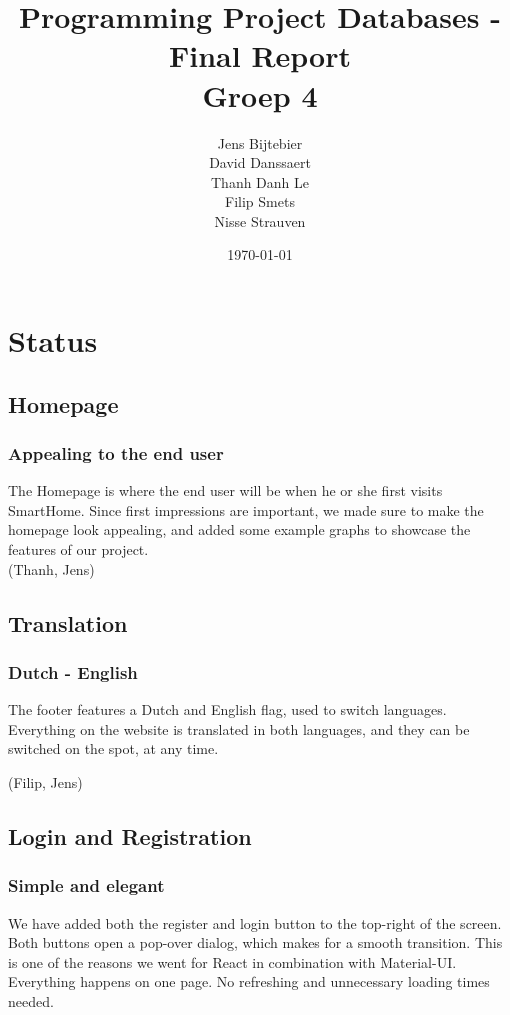 \documentclass[11pt]{article}
\title{\textbf{Programming Project Databases - Final Report}\\
		Groep 4}
\author{Jens Bijtebier\\
		David Danssaert\\
		Thanh Danh Le\\
		Filip Smets\\
		Nisse Strauven}
\date{\today}
\begin{document}
\maketitle


\section{Status}
  \subsection{Homepage}
	\subsubsection{Appealing to the end user}
		The Homepage is where the end user will be when he or she first visits SmartHome.
		Since first impressions are important, we made sure to make the homepage look appealing,
		and added some example graphs to showcase the features of our project.\\

		(Thanh, Jens)

  \subsection{Translation}
	\subsubsection{Dutch - English}
		The footer features a Dutch and English flag, used to switch languages.
		Everything on the website is translated in both languages, and they can be switched on the spot, at any time.

		(Filip, Jens)

  \subsection{Login and Registration}
	\subsubsection{Simple and elegant}
		We have added both the register and login button to the top-right of the screen.
		Both buttons open a pop-over dialog, which makes for a smooth transition.
		This is one of the reasons we went for React in combination with Material-UI.
		Everything happens on one page. No refreshing and unnecessary loading times needed.\\
\end{document}

